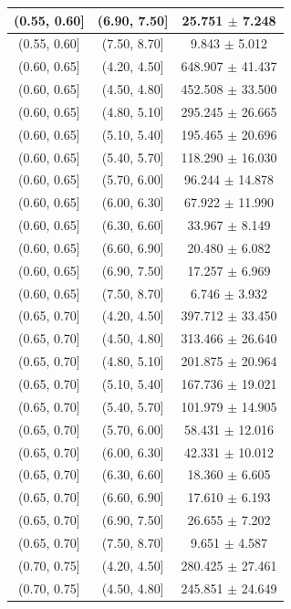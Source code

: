 \begin{longtable}{|c|c|c|}
\hline
(0.55, 0.60] & (6.90, 7.50] & 25.751 $\pm$ 7.248 \\ 
\hline
(0.55, 0.60] & (7.50, 8.70] & 9.843 $\pm$ 5.012 \\ 
\hline
(0.60, 0.65] & (4.20, 4.50] & 648.907 $\pm$ 41.437 \\ 
\hline
(0.60, 0.65] & (4.50, 4.80] & 452.508 $\pm$ 33.500 \\ 
\hline
(0.60, 0.65] & (4.80, 5.10] & 295.245 $\pm$ 26.665 \\ 
\hline
(0.60, 0.65] & (5.10, 5.40] & 195.465 $\pm$ 20.696 \\ 
\hline
(0.60, 0.65] & (5.40, 5.70] & 118.290 $\pm$ 16.030 \\ 
\hline
(0.60, 0.65] & (5.70, 6.00] & 96.244 $\pm$ 14.878 \\ 
\hline
(0.60, 0.65] & (6.00, 6.30] & 67.922 $\pm$ 11.990 \\ 
\hline
(0.60, 0.65] & (6.30, 6.60] & 33.967 $\pm$ 8.149 \\ 
\hline
(0.60, 0.65] & (6.60, 6.90] & 20.480 $\pm$ 6.082 \\ 
\hline
(0.60, 0.65] & (6.90, 7.50] & 17.257 $\pm$ 6.969 \\ 
\hline
(0.60, 0.65] & (7.50, 8.70] & 6.746 $\pm$ 3.932 \\ 
\hline
(0.65, 0.70] & (4.20, 4.50] & 397.712 $\pm$ 33.450 \\ 
\hline
(0.65, 0.70] & (4.50, 4.80] & 313.466 $\pm$ 26.640 \\ 
\hline
(0.65, 0.70] & (4.80, 5.10] & 201.875 $\pm$ 20.964 \\ 
\hline
(0.65, 0.70] & (5.10, 5.40] & 167.736 $\pm$ 19.021 \\ 
\hline
(0.65, 0.70] & (5.40, 5.70] & 101.979 $\pm$ 14.905 \\ 
\hline
(0.65, 0.70] & (5.70, 6.00] & 58.431 $\pm$ 12.016 \\ 
\hline
(0.65, 0.70] & (6.00, 6.30] & 42.331 $\pm$ 10.012 \\ 
\hline
(0.65, 0.70] & (6.30, 6.60] & 18.360 $\pm$ 6.605 \\ 
\hline
(0.65, 0.70] & (6.60, 6.90] & 17.610 $\pm$ 6.193 \\ 
\hline
(0.65, 0.70] & (6.90, 7.50] & 26.655 $\pm$ 7.202 \\ 
\hline
(0.65, 0.70] & (7.50, 8.70] & 9.651 $\pm$ 4.587 \\ 
\hline
(0.70, 0.75] & (4.20, 4.50] & 280.425 $\pm$ 27.461 \\ 
\hline
(0.70, 0.75] & (4.50, 4.80] & 245.851 $\pm$ 24.649 \\ 

\end{longtable}
